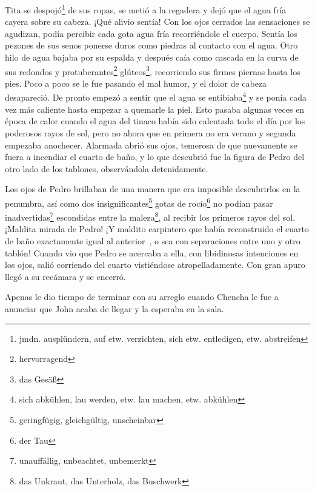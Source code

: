 Tita se despojó\footnote{jmdn. ausplündern, auf etw. verzichten, sich etw. entledigen, etw. abstreifen}
de sus ropas, se metió a la regadera y dejó que el agua
fría cayera sobre su cabeza. ¡Qué alivio sentía! Con los ojos cerrados
las sensaciones se agudizan, podía percibir cada gota agua fría
recorriéndole el cuerpo. Sentía los pezones
de sus senos ponerse duros como piedras al contacto con el agua.
Otro hilo de agua bajaba por su espalda y después caía como cascada en la
curva de sus redondos y protuberantes\footnote{hervorragend} glúteos\footnote{das Gesäß}, recorriendo sus firmes piernas
hasta los pies.
Poco a poco se le fue pasando el mal humor, y el dolor de cabeza
desapareció. De pronto empezó a sentir que el agua se entibiaba\footnote{sich abkühlen, lau werden, etw. lau machen, etw. abkühlen}
y se ponía cada vez más caliente hasta empezar a quemarle la piel. Esto
pasaba algunas veces en época de calor cuando el agua del tinaco había
sido calentada todo el día por los poderosos rayos de sol, pero no ahora
que en primera no era verano y segunda empezaba anochecer. Alarmada
abrió sus ojos, temerosa de que nuevamente se fuera a incendiar el
cuarto de baño, y lo que descubrió fue la figura de Pedro del otro lado
de los tablones, observándola detenidamente.

Los ojos de Pedro brillaban de una manera que era imposible
descubrirlos en la penumbra, así como dos insignificantes\footnote{geringfügig, gleichgültig, unscheinbar}
gotas de rocío\footnote{der Tau} no podían pasar inadvertidas\footnote{unauffällig, unbeachtet, unbemerkt}
escondidas entre la maleza\footnote{das Unkraut, das Unterholz, das Buschwerk},
al recibir los primeros rayos del sol. ¡Maldita mirada de Pedro!
¡Y maldito carpintero que había reconstruido el cuarto de baño exactamente
igual al anterior~, o sea con separaciones entre uno y otro tablón!
Cuando vio que Pedro se acercaba a ella, con libidinosas intenciones
en los ojos, salió corriendo del cuarto vistiéndose atropelladamente.
Con gran apuro llegó a su recámara y se encerró.

Apenas le dio tiempo de terminar con su arreglo cuando Chencha le fue a
anunciar que John acaba de llegar y la esperaba en la sala.

